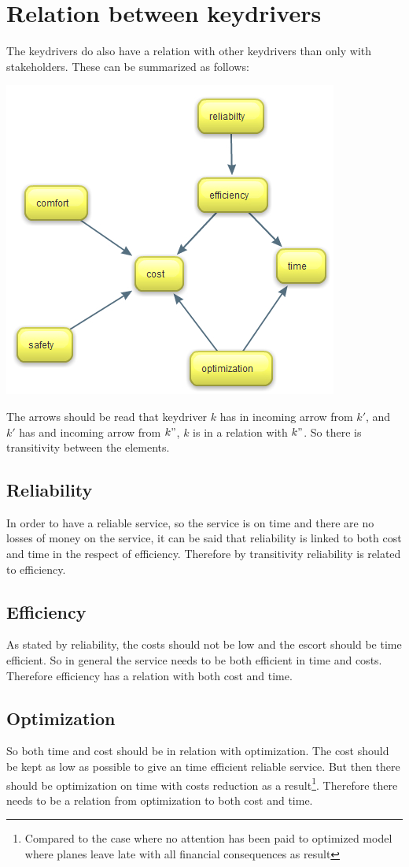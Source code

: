 \documentclass[a4paper, 11pt, notitlepage]{report}
\begin{document}
\section{Relation between keydrivers}
The keydrivers do also have a relation with other keydrivers than only with stakeholders. These can be summarized as follows:
\begin{center}
	\includegraphics[scale=0.45]{figures/relationkeydrivers.jpg}
\end{center}
The arrows should be read that keydriver $k$ has in incoming arrow from $k'$, and $k'$ has and incoming arrow from $k"$, $k$ is in a relation with $k"$. So there is transitivity between the elements.
\subsection{Reliability}
In order to have a reliable service, so the service is on time and there are no losses of money on the service, it can be said that reliability is linked to both cost and time in the respect of efficiency. Therefore by transitivity reliability is related to efficiency.
\subsection{Efficiency}
As stated by reliability, the costs should not be low and the escort should be time efficient. So in general the service needs to be both efficient in time and costs. Therefore efficiency has a relation with both cost and time.
\subsection{Optimization}
So both time and cost should be in relation with optimization. The cost should be kept as low as possible to give an time efficient reliable service. But then there should be optimization on time with costs reduction as a result\footnote{Compared to the case where no attention has been paid to optimized model where planes leave late with all financial consequences as result}. Therefore there needs to be a relation from optimization to both cost and time.
\end{document}
